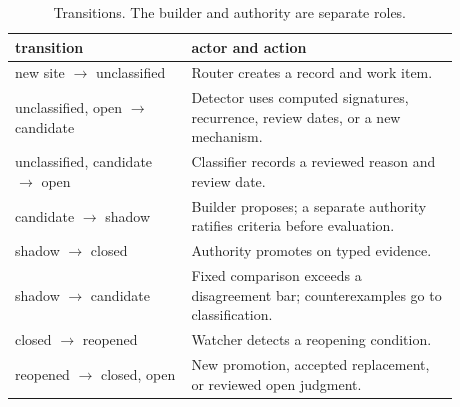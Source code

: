 \documentclass[11pt]{article}
\theoremstyle{definition}
\theoremstyle{remark}
\begin{document}
\begin{table}[ht]
\centering
\small
\begin{tabular}{p{0.35\linewidth}p{0.53\linewidth}}
\toprule
transition & actor and action \\
\midrule
new site $\to$ unclassified & Router creates a record and work item. \\
unclassified, open $\to$ candidate & Detector uses computed signatures, recurrence, review dates,
or a new mechanism. \\
unclassified, candidate $\to$ open & Classifier records a reviewed reason and review date. \\
candidate $\to$ shadow & Builder proposes; a separate authority ratifies criteria before evaluation. \\
shadow $\to$ closed & Authority promotes on typed evidence. \\
shadow $\to$ candidate & Fixed comparison exceeds a disagreement bar; counterexamples go to classification. \\
closed $\to$ reopened & Watcher detects a reopening condition. \\
reopened $\to$ closed, open & New promotion, accepted replacement, or reviewed open judgment. \\
\bottomrule
\end{tabular}
\caption{Transitions. The builder and authority are separate roles.}\label{tab:plantrans}
\end{table}
\end{document}
